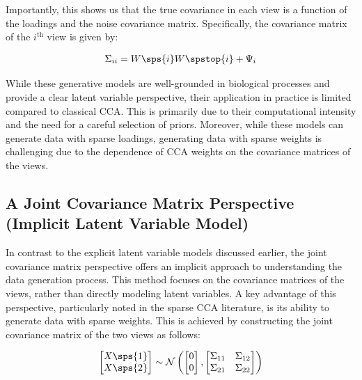 Importantly, this shows us that the true covariance in each view is a function of the loadings and the noise covariance matrix.
Specifically, the covariance matrix of the $i^{\text{th}}$ view is given by:

\begin{align}
    \Sigma_{ii} = W\sps{i}W\spstop{i} + \Psi_i
\end{align}

While these generative models are well-grounded in biological processes and provide a clear latent variable perspective, their application in practice is limited compared to classical CCA.
This is primarily due to their computational intensity and the need for a careful selection of priors.
Moreover, while these models can generate data with sparse loadings, generating data with sparse weights is challenging due to the dependence of CCA weights on the covariance matrices of the views.

\subsection{A Joint Covariance Matrix Perspective (Implicit Latent Variable Model)}\label{subsubsec:a-joint-covariance-matrix-perspective}

In contrast to the explicit latent variable models discussed earlier, the joint covariance matrix perspective offers an implicit approach to understanding the data generation process.
This method focuses on the covariance matrices of the views, rather than directly modeling latent variables.
A key advantage of this perspective, particularly noted in the sparse CCA literature, is its ability to generate data with sparse weights.
This is achieved by constructing the joint covariance matrix of the two views as follows:

\begin{align}\label{eq:covariance}
    \begin{bmatrix} X\sps{1} \\ X\sps{2} \end{bmatrix} \sim \mathcal{N} \left( \begin{bmatrix} 0 \\ 0 \end{bmatrix}, \begin{bmatrix} \Sigma_{11} & \Sigma_{12} \\ \Sigma_{21} & \Sigma_{22} \end{bmatrix} \right)
\end{align}

